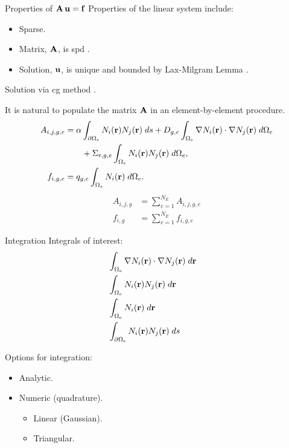 \begin{frame}{Properties of $\mathbf{A} \, \mathbf{u} = \mathbf{f}$}
  Properties of the linear system include:
  \begin{itemize}
    \item Sparse.
    \item Matrix, $\mathbf{A}$, is \gls{spd} \cite{textbookhughes}.
    \item Solution, $\mathbf{u}$, is unique and bounded by Lax-Milgram Lemma 
      \cite{textbookli}.
  \end{itemize}
  Solution via \gls{cg} method 
  \cite{Kelley1995IterativeEquations}.

  It is natural to populate the matrix $\mathbf{A}$ in an element-by-element procedure.
  \begin{align}
    \label{eq:matrix_population}
    A_{i,j,g,e} &= \alpha \int_{\partial \Omega_e} N_i(\mathbf{r}) 
      N_j(\mathbf{r}) \; ds + D_{g,e} 
      \int_{\Omega_e} \mathbf{\nabla} N_i(\mathbf{r}) \cdot \mathbf{\nabla} N_j(\mathbf{r}) \;
      d\Omega_e \\
    &\qquad + \Sigma_{r,g,e} \int_{\Omega_e} N_i(\mathbf{r}) N_j(\mathbf{r})
      \; d\Omega_e, \\
    \label{eq:vector_population}
    f_{i,g,e} &= q_{g,e} \int_{\Omega_e} N_i(\mathbf{r}) \;d\Omega_e.
  \end{align}
  \begin{align}
    A_{i,j,g} &= \sum_{e=1}^{N_E} A_{i,j,g,e} \\
    f_{i,g} &=  \sum_{e=1}^{N_E} f_{i,g,e}
  \end{align}
\end{frame}

\begin{frame}{Integration}
  Integrals of interest:
  \begin{align}
    &\int_{\Omega_e} \mathbf{\nabla} N_i(\mathbf{r}) \cdot \mathbf{\nabla} N_j(\mathbf{r}) 
      \;d\mathbf{r} \\
    &\int_{\Omega_e} N_i(\mathbf{r}) N_j(\mathbf{r}) \;d\mathbf{r} \\
    &\int_{\Omega_e} N_i(\mathbf{r}) \;d\mathbf{r} \\
    &\int_{\partial \Omega_e} N_i(\mathbf{r}) N_j(\mathbf{r}) \;ds &
  \end{align}

  Options for integration:
  \begin{itemize}
    \item Analytic.
    \item Numeric (quadrature).
    \begin{itemize}
      \item Linear (Gaussian).
      \item Triangular.
    \end{itemize}
  \end{itemize}
\end{frame}

